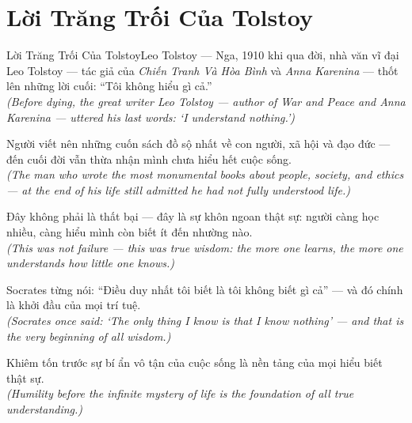 \section{Lời Trăng Trối Của Tolstoy}
\begin{truyen}{Lời Trăng Trối Của Tolstoy}{Leo Tolstoy --- Nga, 1910}
 khi qua đời, nhà văn vĩ đại Leo Tolstoy --- tác giả của \textit{Chiến Tranh Và Hòa Bình} và \textit{Anna Karenina} --- thốt lên những lời cuối: ``Tôi không hiểu gì cả.''\\[4pt]
\textit{(Before dying, the great writer Leo Tolstoy --- author of \textit{War and Peace} and \textit{Anna Karenina} --- uttered his last words: `I understand nothing.')}

Người viết nên những cuốn sách đồ sộ nhất về con người, xã hội và đạo đức --- đến cuối đời vẫn thừa nhận mình chưa hiểu hết cuộc sống.\\[4pt]
\textit{(The man who wrote the most monumental books about people, society, and ethics --- at the end of his life still admitted he had not fully understood life.)}

Đây không phải là thất bại --- đây là sự khôn ngoan thật sự: người càng học nhiều, càng hiểu mình còn biết ít đến nhường nào.\\[4pt]
\textit{(This was not failure --- this was true wisdom: the more one learns, the more one understands how little one knows.)}

Socrates từng nói: ``Điều duy nhất tôi biết là tôi không biết gì cả'' --- và đó chính là khởi đầu của mọi trí tuệ.\\[4pt]
\textit{(Socrates once said: `The only thing I know is that I know nothing' --- and that is the very beginning of all wisdom.)}

\end{truyen}
\begin{baihoc}
  Khiêm tốn trước sự bí ẩn vô tận của cuộc sống là nền tảng của mọi hiểu biết thật sự.\\[4pt]
  \textit{(Humility before the infinite mystery of life is the foundation of all true understanding.)}
\end{baihoc}

